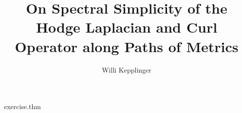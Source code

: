 
\begin{filecontents}{exercise.thm}
\def\th@exercise{%
  \normalfont %
  \thm@headpunct{:}%
}
\end{filecontents}

\documentclass[11pt]{amsart}
\title[Spectral Simplicity of the Hodge Laplacian]{On Spectral Simplicity of the Hodge Laplacian and Curl Operator along Paths of Metrics}
\author{Willi Kepplinger}

\usepackage{amsmath}
\usepackage{amsthm}
\usepackage{amssymb}
\usepackage{graphicx}
\usepackage[backend=biber,style=alphabetic]{biblatex}

\usepackage{hyperref}
\usepackage[pagewise]{lineno}

\newtheorem{thm}{Theorem}[section]
\newtheorem{cor}[thm]{Corollary}
\newtheorem{prop}{Proposition}
\newtheorem{lem}[thm]{Lemma}
\newtheorem{definition}[thm]{Definition}
\newtheorem{proposition}[thm]{Proposition}

\theoremstyle{remark}
\newtheorem*{rmk}{Remark}

\theoremstyle{plain}
\newtheorem*{Ahlfors}{Ahlfors' Lemma}

  {3pt}%
  {3pt}%
  {}%
  {}%
  {\itshape}%
  {:}%
  {.5em}%
  {}%

\theoremstyle{note}
\newtheorem{note}{Note}

  {3pt}%
  {3pt}%
  {\itshape}%
  {}%
  {\bfseries}%
  {.}%
  {.5em}%
  {\thmnote{#3}}%

\theoremstyle{citing}
\newtheorem*{varthm}{}%

  {9pt}%
  {9pt}%
  {\itshape}%
  {}%
  {\bfseries}%
  {.}%
  {\newline}%
  {}%

